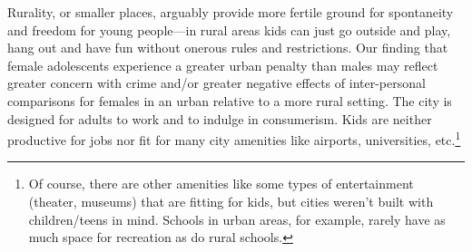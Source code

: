\documentclass[10pt, letterpaper]{article}
\begin{document}
\begin{spacing}{1.4}
Rurality, or smaller places, arguably provide more fertile ground for
spontaneity and freedom for young people---in rural areas kids can just go outside
and play, hang out and have fun without onerous rules and restrictions. Our finding that female adolescents experience a greater urban penalty than males may reflect
greater concern with crime and/or greater negative effects of inter-personal comparisons for females in an urban
relative to a more rural setting. %
The city is designed for  adults to work and to indulge in consumerism. Kids are
neither productive for jobs nor fit for many city amenities like airports,
universities, etc.\footnote{Of course, there are other amenities like some types
  of entertainment (theater, museums) that are fitting for kids, but cities
  weren't built with children/teens in mind. Schools in urban areas, for
  example, rarely have as much space for recreation as do rural schools.} 

\end{spacing}
\end{document}
